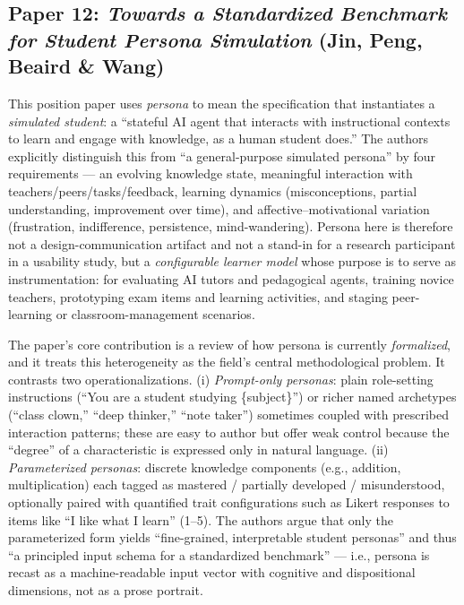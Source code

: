 
\subsection*{Paper 12: \textit{Towards a Standardized Benchmark for Student Persona Simulation} (Jin, Peng, Beaird \& Wang)}

This position paper uses \emph{persona} to mean the specification that instantiates a \emph{simulated student}: a
``stateful AI agent that interacts with instructional contexts to learn and engage with knowledge, as a human student
does.'' The authors explicitly distinguish this from ``a general-purpose simulated persona'' by four requirements --- an
evolving knowledge state, meaningful interaction with teachers/peers/tasks/feedback, learning dynamics (misconceptions,
partial understanding, improvement over time), and affective--motivational variation (frustration, indifference,
persistence, mind-wandering). Persona here is therefore not a design-communication artifact and not a stand-in for a
research participant in a usability study, but a \emph{configurable learner model} whose purpose is to serve as
instrumentation: for evaluating AI tutors and pedagogical agents, training novice teachers, prototyping exam items and
learning activities, and staging peer-learning or classroom-management scenarios.

The paper's core contribution is a review of how persona is currently \emph{formalized}, and it treats this heterogeneity
as the field's central methodological problem. It contrasts two operationalizations. (i) \emph{Prompt-only personas}:
plain role-setting instructions (``You are a student studying \{subject\}'') or richer named archetypes (``class clown,''
``deep thinker,'' ``note taker'') sometimes coupled with prescribed interaction patterns; these are easy to author but
offer weak control because the ``degree'' of a characteristic is expressed only in natural language. (ii)
\emph{Parameterized personas}: discrete knowledge components (e.g., addition, multiplication) each tagged as mastered /
partially developed / misunderstood, optionally paired with quantified trait configurations such as Likert responses to
items like ``I like what I learn'' (1--5). The authors argue that only the parameterized form yields ``fine-grained,
interpretable student personas'' and thus ``a principled input schema for a standardized benchmark'' --- i.e., persona is
recast as a machine-readable input vector with cognitive and dispositional dimensions, not as a prose portrait.


